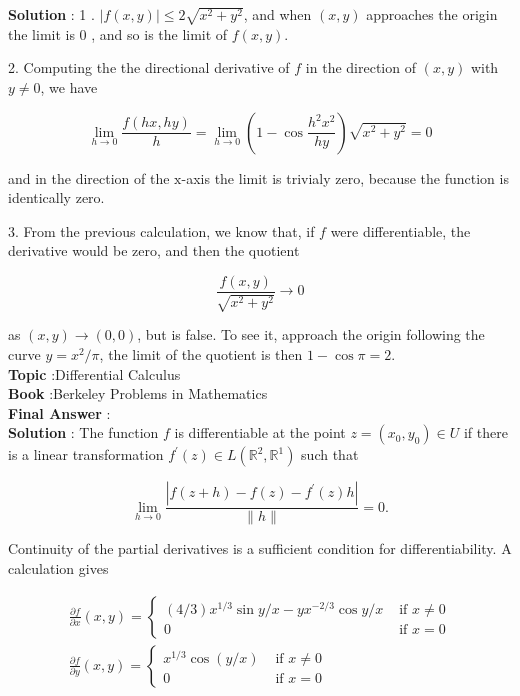 \documentclass[10pt]{article}
\begin{document}
\textbf{Solution} : 1 . $|f(x, y)| \leq 2 \sqrt{x^{2}+y^{2}}$, and when $(x, y)$ approaches the origin the limit is 0 , and so is the limit of $f(x, y)$.

2. Computing the the directional derivative of $f$ in the direction of $(x, y)$ with $y \neq 0$, we have

$$
\lim _{h \rightarrow 0} \frac{f(h x, h y)}{h}=\lim _{h \rightarrow 0}\left(1-\cos \frac{h^{2} x^{2}}{h y}\right) \sqrt{x^{2}+y^{2}}=0
$$

and in the direction of the $\mathrm{x}$-axis the limit is trivialy zero, because the function is identically zero.

3. From the previous calculation, we know that, if $f$ were differentiable, the derivative would be zero, and then the quotient

$$
\frac{f(x, y)}{\sqrt{x^{2}+y^{2}}} \rightarrow 0
$$

as $(x, y) \rightarrow(0,0)$, but is false. To see it, approach the origin following the curve $y=x^{2} / \pi$, the limit of the quotient is then $1-\cos \pi=2$. \\
\textbf{Topic} :Differential Calculus \\
\textbf{Book} :Berkeley Problems in Mathematics\\
\textbf{Final Answer} :\\


\textbf{Solution} : The function $f$ is differentiable at the point $z=\left(x_{0}, y_{0}\right) \in U$ if there is a linear transformation $f^{\prime}(z) \in L\left(\mathbb{R}^{2}, \mathbb{R}^{1}\right)$ such that

$$
\lim _{h \rightarrow 0} \frac{\left|f(z+h)-f(z)-f^{\prime}(z) h\right|}{\|h\|}=0 .
$$

Continuity of the partial derivatives is a sufficient condition for differentiability. A calculation gives

$$
\begin{gathered}
\frac{\partial f}{\partial x}(x, y)= \begin{cases}(4 / 3) x^{1 / 3} \sin y / x-y x^{-2 / 3} \cos y / x & \text { if } x \neq 0 \\
0 & \text { if } x=0\end{cases} \\
\frac{\partial f}{\partial y}(x, y)= \begin{cases}x^{1 / 3} \cos (y / x) & \text { if } x \neq 0 \\
0 & \text { if } x=0\end{cases}
\end{gathered}
$$
\end{document}
